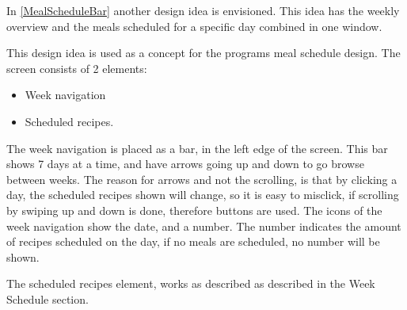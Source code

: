 In \cref{MealScheduleBar} another design idea is envisioned. This idea has the weekly overview and the meals scheduled for a specific day combined in one window.

This design idea is used as a concept for the programs meal schedule design. The screen consists of 2 elements: 

\begin{itemize}
    \item Week navigation
    \item Scheduled recipes.
\end{itemize}

The week navigation is placed as a bar, in the left edge of the screen. This bar shows 7 days at a time, and have arrows going up and down to go browse between weeks. The reason for arrows and not the scrolling, is that by clicking a day, the scheduled recipes shown will change, so it is easy to misclick, if scrolling by swiping up and down is done, therefore buttons are used. The icons of the week navigation show the date, and a number. The number indicates the amount of recipes scheduled on the day, if no meals are scheduled, no number will be shown. 

The scheduled recipes element, works as described as described in the Week Schedule section.

